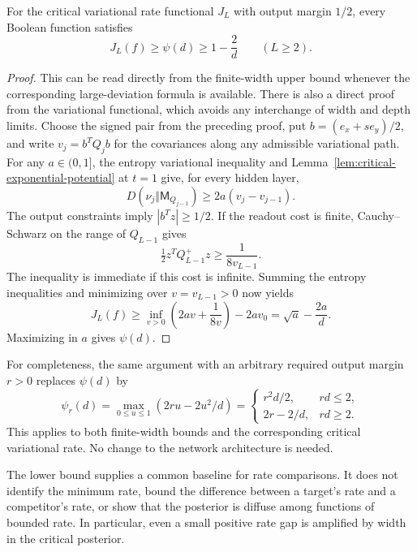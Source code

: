 \begin{corollary}
\label{cor:critical-rate-baseline}
For the critical variational rate functional $J_L$ with output margin
$1/2$, every Boolean function satisfies
\[
 J_L(f)\ge\psi(d)\ge1-\frac2d\qquad(L\ge2).
\]
\end{corollary}

\begin{proof}
This can be read directly from the finite-width upper bound whenever
the corresponding large-deviation formula is available. There is also
a direct proof from the variational functional, which avoids any
interchange of width and depth limits. Choose the signed pair from the
preceding proof, put $b=(e_x+se_y)/2$, and write $v_j=b^TQ_jb$ for
the covariances along any admissible variational path.
For any $a\in(0,1]$, the entropy variational inequality and
Lemma~\ref{lem:critical-exponential-potential} at $t=1$ give, for every hidden layer,
\[
 D(\nu_j\Vert\mathsf M_{Q_{j-1}})\ge2a(v_j-v_{j-1}).
\]
The output constraints imply $|b^Tz|\ge1/2$. If the readout cost is
finite, Cauchy--Schwarz on the range of $Q_{L-1}$ gives
\[
 \tfrac12 z^TQ_{L-1}^{+}z\ge\frac1{8v_{L-1}}.
\]
The inequality is immediate if this cost is infinite. Summing the
entropy inequalities and minimizing over $v=v_{L-1}>0$ now yields
\[
 J_L(f)\ge\inf_{v>0}\left(2av+\frac1{8v}\right)-2av_0
             =\sqrt a-\frac{2a}{d}.
\]
Maximizing in $a$ gives $\psi(d)$.
\end{proof}

For completeness, the same argument with an arbitrary required output
margin $r>0$ replaces $\psi(d)$ by
\[
 \psi_r(d)=\max_{0\le u\le1}(2ru-2u^2/d)
 =\begin{cases}r^2d/2,&rd\le2,\\2r-2/d,&rd\ge2.\end{cases}
\]
This applies to both finite-width bounds and the corresponding critical
variational rate. No change to the network architecture is needed.

The lower bound supplies a common baseline for rate comparisons. It
does not identify the minimum rate, bound the difference between a
target's rate and a competitor's rate, or show that the posterior is
diffuse among functions of bounded rate. In particular, even a small
positive rate gap is amplified by width in the critical posterior.
